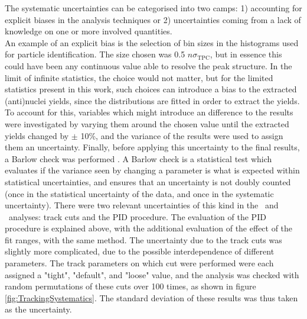 The systematic uncertainties can be categorised into two camps: 1) accounting for explicit biases in the analysis techniques or 2) uncertainties coming from a lack of knowledge on one or more involved quantities. \\
An example of an explicit bias is the selection of bin sizes in the histograms used for particle identification. The size chosen was 0.5 $n\sigma_{\mathrm{TPC}}$, but in essence this could have been any continuous value able to resolve the peak structure. In the limit of infinite statistics, the choice would not matter, but for the limited statistics present in this work, such choices can introduce a bias to the extracted (anti)nuclei yields, since the distributions are fitted in order to extract the yields. To account for this, variables which might introduce an difference to the results were investigated by varying them around the chosen value until the extracted yields changed by $\pm$ 10\%, and the variance of the results were used to assign them an uncertainty. Finally, before applying this uncertainty to the final results, a Barlow check was performed \cite{Barlow:2002yb}. A Barlow check is a statistical test which evaluates if the variance seen by changing a parameter is what is expected within statistical uncertainties, and ensures that an uncertainty is not doubly counted (once in the statistical uncertainty of the data, and once in the systematic uncertainty). There were two relevant uncertainties of this kind in the \ahe\ and \atrit\ analyses: track cuts and the PID procedure. The evaluation of the PID procedure is explained above, with the additional evaluation of the effect of the fit ranges, with the same method. The uncertainty due to the track cuts was slightly more complicated, due to the possible interdependence of different parameters. The track parameters on which cut were performed were each assigned a "tight", "default", and "loose" value, and the analysis was checked with random permutations of these cuts over 100 times, as shown in figure \ref{fig:TrackingSystematics}. The standard deviation of these results was thus taken as the uncertainty. \\

